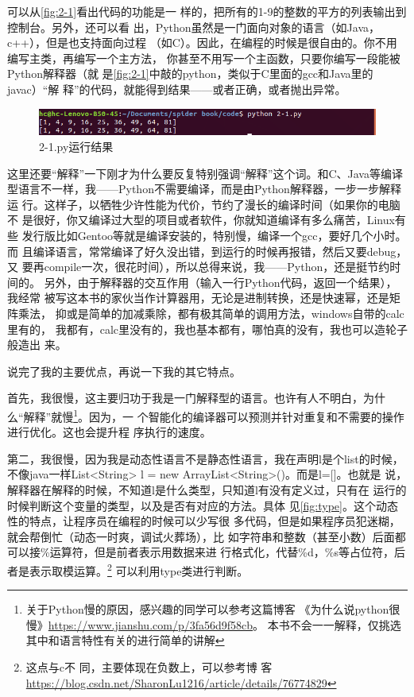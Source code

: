 \documentclass[11pt,UTF8,oneside]{mybook}
\begin{document}

可以从\autoref{fig:2-1}看出代码的功能是一
样的，把所有的1-9的整数的平方的列表输出到控制台。另外，还可以看
出，Python虽然是一门面向对象的语言（如Java，c++），但是也支持面向过程
（如C）。因此，在编程的时候是很自由的。你不用编写主类，再编写一个主方法，
你甚至不用写一个主函数，只要你编写一段能被Python解释器（就
是\autoref{fig:2-1}中敲的python，类似于C里面的gcc和Java里的javac）“解
释”的代码，就能得到结果——或者正确，或者抛出异常。
\begin{figure}[htb]
  \centering \includegraphics[width=\textwidth]{./figure/2-1.png}
  \caption{2-1.py运行结果}
  \label{fig:2-1}
\end{figure}


这里还要“解释”一下刚才为什么要反复特别强调“解释”这个词。和C、Java等编译
型语言不一样，我——Python不需要编译，而是由Python解释器，一步一步解释运
行。这样子，以牺牲少许性能为代价，节约了漫长的编译时间（如果你的电脑不
是很好，你又编译过大型的项目或者软件，你就知道编译有多么痛苦，Linux有些
发行版比如Gentoo等就是编译安装的，特别慢，编译一个gcc，要好几个小时。而
且编译语言，常常编译了好久没出错，到运行的时候再报错，然后又要debug，又
要再compile一次，很花时间），所以总得来说，我——Python，还是挺节约时间的。
另外，由于解释器的交互作用（输入一行Python代码，返回一个结果），我经常
被写这本书的家伙当作计算器用，无论是进制转换，还是快速幂，还是矩阵乘法，
抑或是简单的加减乘除，都有极其简单的调用方法，windows自带的calc里有的，
我都有，calc里没有的，我也基本都有，哪怕真的没有，我也可以造轮子般造出
来。

说完了我的主要优点，再说一下我的其它特点。

首先，我很慢，这主要归功于我是一门解释型的语言。也许有人不明白，为什
么“解释”就慢\footnote{关于Python慢的原因，感兴趣的同学可以参考这篇博客
  《为什么说python很慢》\url{https://www.jianshu.com/p/3fa56d9f58cb}。
  本书不会一一解释，仅挑选其中和语言特性有关的进行简单的讲解}。因为，一
个智能化的编译器可以预测并针对重复和不需要的操作进行优化。这也会提升程
序执行的速度。

第二，我很慢，因为我是动态性语言不是静态性语言，我在声明l是个list的时候，
不像java一样List<String> l = new ArrayList<String>()。而是l=[]。也就是
说，解释器在解释的时候，不知道l是什么类型，只知道l有没有定义过，只有在
运行的时候判断这个变量的类型，以及是否有对应的方法。具体
见\autoref{fig:type}。这个动态性的特点，让程序员在编程的时候可以少写很
多代码，但是如果程序员犯迷糊，就会帮倒忙（动态一时爽，调试火葬场），比
如字符串和整数（甚至小数）后面都可以接\%运算符，但是前者表示用数据来进
行格式化，代替\%d，\%s等占位符，后者是表示取模运算。\footnote{这点与c不
  同，主要体现在负数上，可以参考博
  客\url{https://blog.csdn.net/SharonLu1216/article/details/76774829}}
可以利用type类进行判断。
\end{document}

